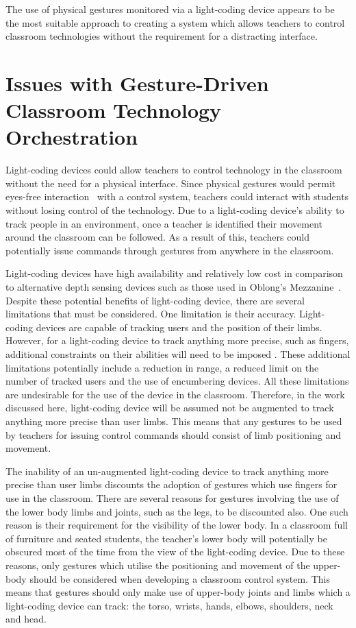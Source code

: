 \documentclass[link]{IWCOMP}
\begin{document}
The use of physical gestures monitored via a light-coding device appears to be the most suitable approach to creating a system which allows teachers to control classroom technologies without the requirement for a distracting interface.

\section{Issues with Gesture-Driven Classroom Technology Orchestration} 
\label{sec:issues}

Light-coding devices could allow teachers to control technology in the classroom without the need for a physical interface.
Since physical gestures would permit eyes-free interaction~\cite{Brewster2003} with a control system, teachers could interact with students without losing control of the technology.
Due to a light-coding device's ability to track people in an environment, once a teacher is identified their movement around the classroom can be followed.
As a result of this, teachers could potentially issue commands through gestures from anywhere in the classroom.

Light-coding devices have high availability and relatively low cost in comparison to alternative depth sensing devices such as those used in Oblong's Mezzanine~\cite{kramer2011}.
Despite these potential benefits of light-coding device, there are several limitations that must be considered.
One limitation is their accuracy.
Light-coding devices are capable of tracking users and the position of their limbs.
However, for a light-coding device to track anything more precise, such as fingers, additional constraints on their abilities will need to be imposed \cite{Clark2011}.
These additional limitations potentially include a reduction in range, a reduced limit on the number of tracked users and the use of encumbering devices.
All these limitations are undesirable for the use of the device in the classroom.
Therefore, in the work discussed here, light-coding device will be assumed not be augmented to track anything more precise than user limbs.
This means that any gestures to be used by teachers for issuing control commands should consist of limb positioning and movement.

The inability of an un-augmented light-coding device to track anything more precise than user limbs discounts the adoption of gestures which use fingers for use in the classroom.
There are several reasons for gestures involving the use of the lower body limbs and joints, such as the legs, to be discounted also.
One such reason is their requirement for the visibility of the lower body.
In a classroom full of furniture and seated students, the teacher's lower body will potentially be obscured most of the time from the view of the light-coding device.
Due to these reasons, only gestures which utilise the positioning and movement of the upper-body should be considered when developing a classroom control system.
This means that gestures should only make use of upper-body joints and limbs which a light-coding device can track: the torso, wrists, hands, elbows, shoulders, neck and head.
\end{document}
